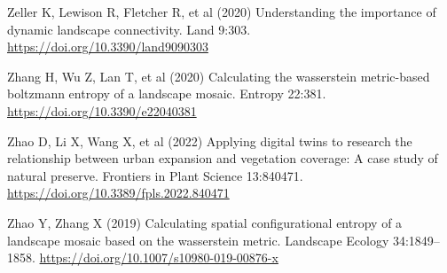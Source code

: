 \documentclass[
  10pt,
  a4paperpaper,
]{article}
\newlength{\cslhangindent}
\newenvironment{CSLReferences}[2] %
 {\begin{list}{}{%
  \setlength{\itemindent}{0pt}
  \setlength{\leftmargin}{0pt}
  \setlength{\parsep}{0pt}
  \ifodd #1
   \setlength{\leftmargin}{\cslhangindent}
   \setlength{\itemindent}{-1\cslhangindent}
  \fi
  \setlength{\itemsep}{#2\baselineskip}}}
 {\end{list}}
\begin{document}
\begin{CSLReferences}{1}{1}
Zeller K, Lewison R, Fletcher R, et al (2020) Understanding the
importance of dynamic landscape connectivity. Land 9:303.
\url{https://doi.org/10.3390/land9090303}

Zhang H, Wu Z, Lan T, et al (2020) Calculating the wasserstein
metric-based boltzmann entropy of a landscape mosaic. Entropy 22:381.
\url{https://doi.org/10.3390/e22040381}

Zhao D, Li X, Wang X, et al (2022) Applying digital twins to research
the relationship between urban expansion and vegetation coverage: A case
study of natural preserve. Frontiers in Plant Science 13:840471.
\url{https://doi.org/10.3389/fpls.2022.840471}

Zhao Y, Zhang X (2019) Calculating spatial configurational entropy of a
landscape mosaic based on the wasserstein metric. Landscape Ecology
34:1849--1858. \url{https://doi.org/10.1007/s10980-019-00876-x}

\end{CSLReferences}

\endgroup
\end{document}
